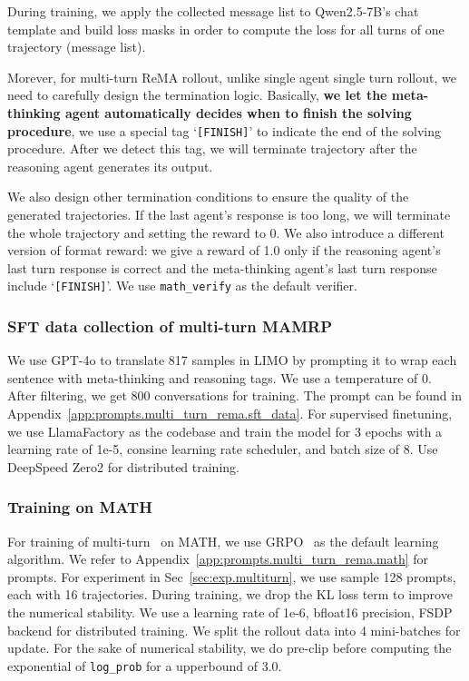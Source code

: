 During training, we apply the collected message list to Qwen2.5-7B's chat template and build loss masks in order to compute the loss for all turns of one trajectory (message list).

Morever, for multi-turn ReMA rollout, unlike single agent single turn rollout, we need to carefully design the termination logic. Basically, \textbf{we let the meta-thinking agent automatically decides when to finish the solving procedure}, we use a special tag `\texttt{[FINISH]}' to indicate the end of the solving procedure. After we detect this tag, we will terminate trajectory after the reasoning agent generates its output.

We also design other termination conditions to ensure the quality of the generated trajectories. If the last agent's response is too long, we will terminate the whole trajectory and setting the reward to 0.
We also introduce a different version of format reward: we give a reward of 1.0 only if the reasoning agent's last turn response is correct and the meta-thinking agent's last turn response include `\texttt{[FINISH]}'.
We use \texttt{math\_verify} as the default verifier.

\subsubsection{SFT data collection of multi-turn MAMRP}
\label{app:exp_setting.multi_turn_rema.sft_data}
We use GPT-4o to translate 817 samples in LIMO \citep{ye2025limo} by prompting it to wrap each sentence with meta-thinking and reasoning tags.
We use a temperature of 0. After filtering, we get 800 conversations for training.
The prompt can be found in Appendix~\ref{app:prompts.multi_turn_rema.sft_data}.
For supervised finetuning, we use LlamaFactory as the codebase and train the model for 3 epochs with a learning rate of 1e-5, consine learning rate scheduler, and batch size of 8. Use DeepSpeed Zero2 for distributed training.


\subsubsection{Training on MATH}
\label{app:exp_setting.multi_turn_rema.math}
For training of multi-turn \method~on MATH, we use GRPO~\citep{shao2024deepseekmath} as the default learning algorithm.
We refer to Appendix~\ref{app:prompts.multi_turn_rema.math} for prompts.
For experiment in Sec~\ref{sec:exp.multiturn}, we use sample 128 prompts, each with 16 trajectories. During training, we drop the KL loss term to improve the numerical stability. We use a learning rate of 1e-6, bfloat16 precision, FSDP backend for distributed training. 
We split the rollout data into 4 mini-batches for update. For the sake of numerical stability, we do pre-clip before computing the exponential of \texttt{log\_prob} for a upperbound of 3.0.

